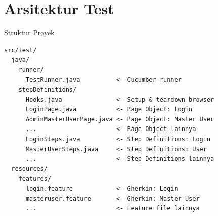 \documentclass[aspectratio=169]{beamer}
\begin{document}
\section{Arsitektur Test}

\begin{frame}[fragile]{Struktur Proyek}
\begin{lstlisting}[language={},title={Struktur Direktori}]
src/test/
  java/
    runner/
      TestRunner.java          <- Cucumber runner
    stepDefinitions/
      Hooks.java               <- Setup & teardown browser
      LoginPage.java           <- Page Object: Login
      AdminMasterUserPage.java <- Page Object: Master User
      ...                      <- Page Object lainnya
      LoginSteps.java          <- Step Definitions: Login
      MasterUserSteps.java     <- Step Definitions: User
      ...                      <- Step Definitions lainnya
  resources/
    features/
      login.feature            <- Gherkin: Login
      masteruser.feature       <- Gherkin: Master User
      ...                      <- Feature file lainnya
\end{lstlisting}
\end{frame}
\end{document}

